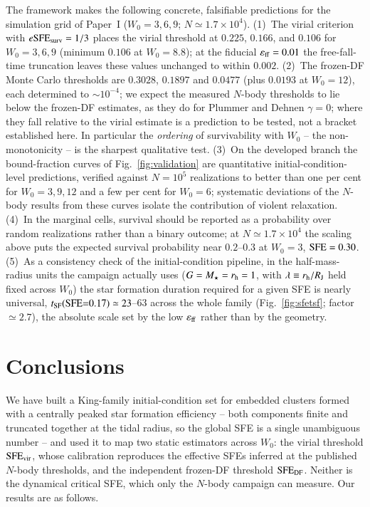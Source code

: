 \documentclass{aa}
\newcommand{\esfe}{e{\rm SFE}}
\newcommand{\sfe}{{\rm SFE}}
\newcommand{\tsf}{t_{\rm SF}}
\newcommand{\effE}{\varepsilon_{\rm ff}}
\begin{document}
The framework makes the following concrete, falsifiable predictions for
the simulation grid of Paper~I ($W_0=3,6,9$;
$N\simeq1.7\times10^4$).
(1)~The virial criterion with $\esfe_{\rm surv}=1/3$ places the virial
threshold at $0.225$, $0.166$, and $0.106$ for $W_0=3,6,9$ (minimum
$0.106$ at $W_0=8.8$); at the fiducial $\effE=0.01$ the free-fall-time
truncation leaves these values unchanged to within $0.002$.
(2)~The frozen-DF Monte Carlo thresholds are $0.3028$, $0.1897$ and
$0.0477$ (plus $0.0193$ at $W_0=12$), each determined to
$\sim\!10^{-4}$;
we expect the measured $N$-body thresholds to lie below the frozen-DF
estimates, as they do for Plummer and Dehnen $\gamma=0$; where they fall
relative to the virial estimate is a prediction to be tested, not a
bracket established here. In particular the
\emph{ordering} of survivability with $W_0$ -- the non-monotonicity --
is the sharpest qualitative test.
(3)~On the developed branch the bound-fraction curves of
Fig.~\ref{fig:validation} are quantitative initial-condition-level
predictions, verified against $N=10^5$ realizations to better than one
per cent for $W_0=3,9,12$ and a few per cent for $W_0=6$; systematic
deviations of the $N$-body results from these curves isolate the
contribution of violent relaxation.
(4)~In the marginal cells, survival should be reported as a probability
over random realizations rather than a binary outcome; at
$N\simeq1.7\times10^4$ the scaling above puts the expected survival
probability near $0.2$--$0.3$ at $W_0=3$, $\sfe=0.30$.
(5)~As a consistency check of the initial-condition pipeline, in the
half-mass-radius units the campaign actually uses ($G=M_\star=r_{\rm h}=1$,
with $\lambda\equiv r_{\rm h}/R_{\rm J}$ held fixed across $W_0$) the
star formation duration required for a given SFE is nearly universal,
$\tsf(\sfe{=}0.17)\simeq23$--$63$ across the whole family
(Fig.~\ref{fig:sfetsf}; factor $\simeq2.7$), the absolute scale set by
the low $\effE$ rather than by the geometry.

\section{Conclusions}
\label{sec:conclusions}

We have built a King-family initial-condition set for embedded clusters
formed with a centrally peaked star formation efficiency -- both
components finite and truncated together at the tidal radius, so the
global SFE is a single unambiguous number -- and used it to map two
static estimators across $W_0$: the virial threshold $\sfe_{\rm vir}$,
whose calibration reproduces the effective SFEs inferred at the published
$N$-body thresholds, and the independent frozen-DF threshold
$\sfe_{\rm DF}$. Neither is the dynamical critical SFE, which only the
$N$-body campaign can measure. Our results are as follows.
\end{document}
